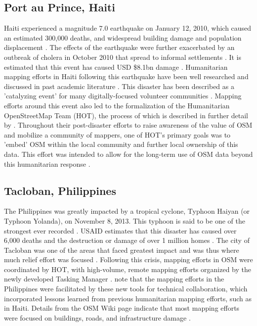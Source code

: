 \subsection{Port au Prince, Haiti}

Haiti experienced a magnitude 7.0 earthquake on January 12, 2010, which caused an estimated 300,000 deaths, and widespread building damage and population displacement \parencite{desroches_overview_2011}. The effects of the earthquake were further exacerbated by an outbreak of cholera in October 2010 that spread to informal settlements \parencite{noauthor_world_2011}. It is estimated that this event has caused USD \$8.1bn damage \parencite{cavallo_estimating_2010}. Humanitarian mapping efforts in Haiti following this earthquake have been well researched and discussed in past academic literature \parencite{zook_volunteered_2010, soden_crowdsourced_2014, palen_success_2015, meier_crisis_2012}. This disaster has been described as a 'catalyzing event' for many digitally-focused volunteer communities \parencite[p. 314]{soden_crowdsourced_2014}. Mapping efforts around this event also led to the formalization of the Humanitarian OpenStreetMap Team (HOT), the process of which is described in further detail by \textcite{soden_crowdsourced_2014}. Throughout their post-disaster efforts to raise awareness of the value of OSM and mobilize a community of mappers, one of HOT's primary goals was to 'embed' OSM within the local community and further local ownership of this data. This effort was intended to allow for the long-term use of OSM data beyond this humanitarian response \parencite{soden_crowdsourced_2014}.

\subsection{Tacloban, Philippines}

The Philippines was greatly impacted by a tropical cyclone, Typhoon Haiyan (or Typhoon Yolanda), on November 8, 2013. This typhoon is said to be one of the strongest ever recorded \parencite{lum_typhoon_2014}. USAID estimates that this disaster has caused over 6,000 deaths and the destruction or damage of over 1 million homes \parencite{noauthor_typhoon_2014}. The city of Tacloban was one of the areas that faced greatest impact and was thus where much relief effort was focused \parencite{lum_typhoon_2014}. Following this crisis, mapping efforts in OSM were coordinated by HOT, with high-volume, remote mapping efforts organized by the newly developed Tasking Manager \parencite{noauthor_wikiproject_2018}. \textcite{palen_success_2015} note that the mapping efforts in the Philippines were facilitated by these new tools for technical collaboration, which incorporated lessons learned from previous humanitarian mapping efforts, such as in Haiti. Details from the OSM Wiki page indicate that most mapping efforts were focused on buildings, roads, and infrastructure damage \parencite{noauthor_wikiproject_2018}. 

